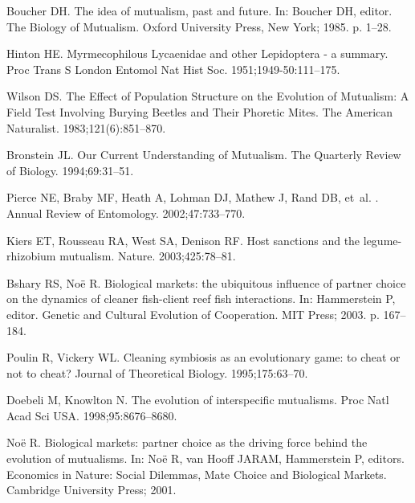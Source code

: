 \documentclass[aps,pre,amsfonts,floatfix, onecolumn,showkeys]{revtex4-1}
\begin{document}
\begin{thebibliography}{10}

Boucher DH.
\newblock The idea of mutualism, past and future.
\newblock In: Boucher DH, editor. The Biology of Mutualism. Oxford University
  Press, New York; 1985. p. 1--28.

Hinton HE.
\newblock Myrmecophilous Lycaenidae and other Lepidoptera - a summary.
\newblock Proc Trans S London Entomol Nat Hist Soc. 1951;1949-50:111--175.

Wilson DS.
\newblock The Effect of Population Structure on the Evolution of Mutualism: A
  Field Test Involving Burying Beetles and Their Phoretic Mites.
\newblock The American Naturalist. 1983;121(6):851--870.

Bronstein JL.
\newblock Our Current Understanding of Mutualism.
\newblock The Quarterly Review of Biology. 1994;69:31--51.

Pierce NE, Braby MF, Heath A, Lohman DJ, Mathew J, Rand DB, et~al.
.
\newblock Annual Review of Entomology. 2002;47:733--770.

Kiers ET, Rousseau RA, West SA, Denison RF.
\newblock Host sanctions and the legume-rhizobium mutualism.
\newblock Nature. 2003;425:78--81.

Bshary RS, No\"{e} R.
\newblock Biological markets: the ubiquitous influence of partner choice on the
  dynamics of cleaner fish-client reef fish interactions.
\newblock In: Hammerstein P, editor. Genetic and Cultural Evolution of
  Cooperation. MIT Press; 2003. p. 167--184.

Poulin R, Vickery WL.
\newblock Cleaning symbiosis as an evolutionary game: to cheat or not to cheat?
\newblock Journal of Theoretical Biology. 1995;175:63--70.

Doebeli M, Knowlton N.
\newblock The evolution of interspecific mutualisms.
\newblock Proc Natl Acad Sci USA. 1998;95:8676--8680.

No{\"e} R.
\newblock Biological markets: partner choice as the driving force behind the
  evolution of mutualisms.
\newblock In: No{\"e} R, van Hooff JARAM, Hammerstein P, editors. Economics in
  Nature: Social Dilemmas, Mate Choice and Biological Markets. Cambridge
  University Press; 2001.


\end{thebibliography}
\end{document}
